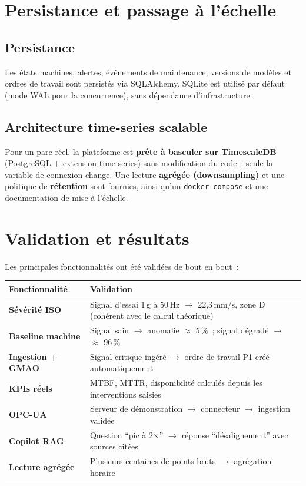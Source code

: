 \documentclass[12pt,a4paper]{article}
\begin{document}
\section{Persistance et passage à l'échelle}

\subsection{Persistance}
Les états machines, alertes, événements de maintenance, versions de modèles et ordres de
travail sont persistés via SQLAlchemy. SQLite est utilisé par défaut (mode WAL pour la
concurrence), sans dépendance d'infrastructure.

\subsection{Architecture time-series scalable}
Pour un parc réel, la plateforme est \textbf{prête à basculer sur TimescaleDB}
(PostgreSQL + extension time-series) sans modification du code~: seule la variable de
connexion change. Une lecture \textbf{agrégée (downsampling)} et une politique de
\textbf{rétention} sont fournies, ainsi qu'un \texttt{docker-compose} et une documentation
de mise à l'échelle.

\section{Validation et résultats}
Les principales fonctionnalités ont été validées de bout en bout~:
\begin{center}
\begin{tabular}{>{\bfseries}p{4.6cm} p{9cm}}
\toprule
Fonctionnalité & Validation \\
\midrule
Sévérité ISO & Signal d'essai 1\,g à 50\,Hz $\rightarrow$ 22,3\,mm/s, zone D (cohérent avec le calcul théorique) \\
Baseline machine & Signal sain $\rightarrow$ anomalie $\approx$ 5\,\%~; signal dégradé $\rightarrow$ $\approx$ 96\,\% \\
Ingestion + GMAO & Signal critique ingéré $\rightarrow$ ordre de travail P1 créé automatiquement \\
KPIs réels & MTBF, MTTR, disponibilité calculés depuis les interventions saisies \\
OPC-UA & Serveur de démonstration $\rightarrow$ connecteur $\rightarrow$ ingestion validée \\
Copilot RAG & Question ``pic à 2$\times$'' $\rightarrow$ réponse ``désalignement'' avec sources citées \\
Lecture agrégée & Plusieurs centaines de points bruts $\rightarrow$ agrégation horaire \\
\bottomrule
\end{tabular}
\end{center}
\end{document}
